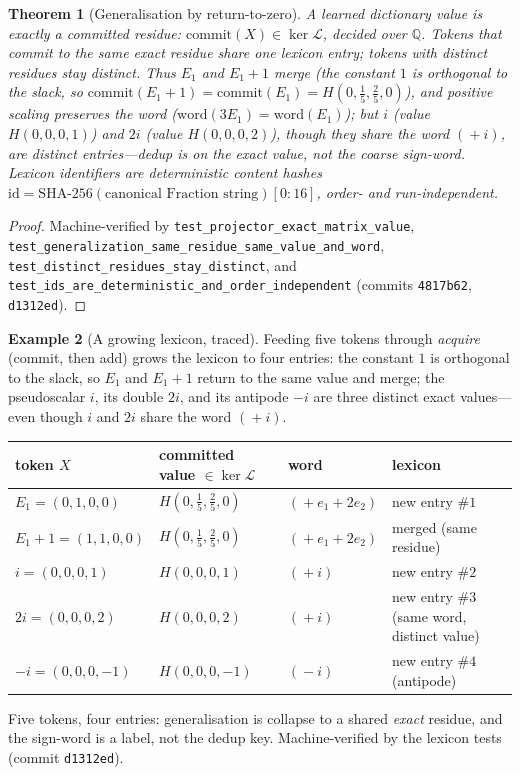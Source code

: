 \documentclass[11pt]{article}
\theoremstyle{plain}
\newtheorem{theorem}{Theorem}[section]
\theoremstyle{definition}
\newtheorem{example}[theorem]{Example}
\theoremstyle{remark}
\newcommand{\Q}{\mathbb{Q}}
\newcommand{\Lop}{\mathcal{L}}
\begin{document}
\begin{theorem}[Generalisation by return-to-zero]\label{thm:generalise}
A learned dictionary value is exactly a committed residue: $\mathrm{commit}(X)\in\ker\Lop$, decided over $\Q$.
Tokens that commit to the \emph{same} exact residue share one lexicon entry; tokens with \emph{distinct}
residues stay distinct. Thus $E_1$ and $E_1+1$ merge (the constant $1$ is orthogonal to the slack, so
$\mathrm{commit}(E_1+1)=\mathrm{commit}(E_1)=H(0,\tfrac15,\tfrac25,0)$), and positive scaling preserves the
word ($\mathrm{word}(3E_1)=\mathrm{word}(E_1)$); but $i$ (value $H(0,0,0,1)$) and $2i$ (value $H(0,0,0,2)$),
though they share the word $(\!+i)$, are \emph{distinct} entries---dedup is on the exact value, not the coarse
sign-word. Lexicon identifiers are deterministic content hashes
$\mathrm{id}=\mathrm{SHA}\text{-}256(\text{canonical }\mathrm{Fraction}\text{ string})[0{:}16]$, order- and
run-independent.
\end{theorem}
\begin{proof}
Machine-verified by \texttt{test\_projector\_exact\_matrix\_value},
\texttt{test\_generalization\_same\_residue\_same\_value\_and\_word},
\texttt{test\_distinct\_residues\_stay\_distinct}, and
\texttt{test\_ids\_are\_deterministic\_and\_order\_independent} (commits \texttt{4817b62}, \texttt{d1312ed}).
\end{proof}

\begin{example}[A growing lexicon, traced]\label{ex:lexicon}
Feeding five tokens through \emph{acquire} (commit, then add) grows the lexicon to four entries: the constant
$1$ is orthogonal to the slack, so $E_1$ and $E_1+1$ return to the same value and merge; the pseudoscalar
$i$, its double $2i$, and its antipode $-i$ are three distinct exact values---even though $i$ and $2i$ share
the word $(\!+i)$.
\begin{center}
\begin{tabular}{llll}
\toprule
token $X$ & committed value $\in\ker\Lop$ & word & lexicon \\
\midrule
$E_1=(0,1,0,0)$    & $H(0,\tfrac15,\tfrac25,0)$ & $(\!+e_1{+}2e_2)$ & new entry $\#1$ \\
$E_1+1=(1,1,0,0)$  & $H(0,\tfrac15,\tfrac25,0)$ & $(\!+e_1{+}2e_2)$ & merged (same residue) \\
$i=(0,0,0,1)$      & $H(0,0,0,1)$               & $(\!+i)$          & new entry $\#2$ \\
$2i=(0,0,0,2)$     & $H(0,0,0,2)$               & $(\!+i)$          & new entry $\#3$ (same word, distinct value) \\
$-i=(0,0,0,-1)$    & $H(0,0,0,-1)$              & $(\!-i)$          & new entry $\#4$ (antipode) \\
\bottomrule
\end{tabular}
\end{center}
Five tokens, four entries: generalisation is collapse to a shared \emph{exact} residue, and the sign-word is a
label, not the dedup key. Machine-verified by the lexicon tests (commit \texttt{d1312ed}).
\end{example}
\end{document}
